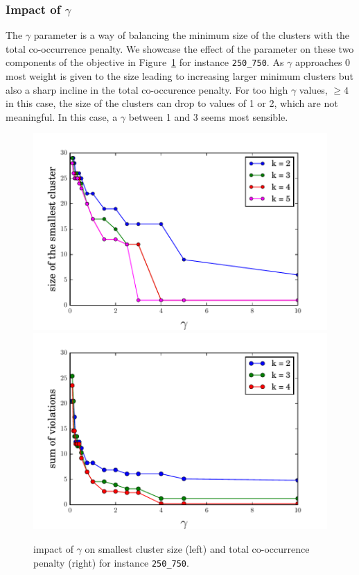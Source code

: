 \documentclass[conference]{IEEEtran}
\begin{document}
\subsubsection{Impact of $\gamma$}
The $\gamma$ parameter is a way of balancing the minimum size of the clusters with the total co-occurrence penalty. We showcase the effect of the parameter on these two components of the objective in Figure~\ref{fig:gamma} for instance \texttt{250\_750}. As $\gamma$ approaches $0$ most weight is given to the size leading to increasing larger minimum clusters but also a sharp incline in the total co-occurence penalty. For too high $\gamma$ values, $\geq 4$in this case, the size of the clusters can drop to values of 1 or 2, which are not meaningful. In this case, a $\gamma$ between 1 and 3 seems most sensible.

\begin{figure}
\centering
\includegraphics[scale=0.28]{images/clsize}
\includegraphics[scale=0.28]{images/penalty}
\captionsetup{font=small}
\caption{impact of $\gamma$ on smallest cluster size (left) and total co-occurrence penalty (right) for instance \texttt{250\_750}.}
\label{fig:gamma}
\end{figure}
\end{document}
